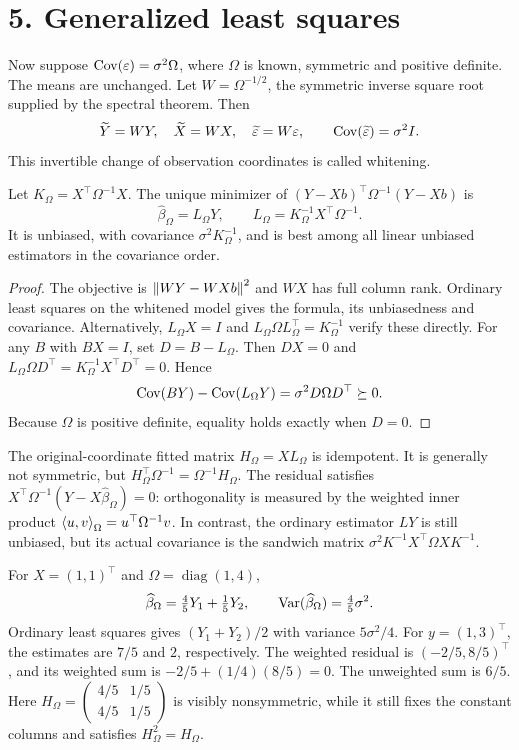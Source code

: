 \section*{5. Generalized least squares}
Now suppose $\operatorname{Cov}(\varepsilon)=\sigma^2\Omega$, where $\Omega$ is known,
symmetric and positive definite. The means are unchanged. Let
$W=\Omega^{-1/2}$, the symmetric inverse square root supplied by the
spectral theorem. Then
\[
\widetilde Y=WY,\quad\widetilde X=WX,\quad
\widetilde\varepsilon=W\varepsilon,
\qquad\operatorname{Cov}(\widetilde\varepsilon)=\sigma^2I.
\]
This invertible change of observation coordinates is called whitening.

\begin{theorem}\label{thm:11:gls}
Let $K_\Omega=X^\top\Omega^{-1}X$. The unique minimizer of
$(Y-Xb)^\top\Omega^{-1}(Y-Xb)$ is
\[
\widehat\beta_\Omega=L_\Omega Y,\qquad
L_\Omega=K_\Omega^{-1}X^\top\Omega^{-1}.
\]
It is unbiased, with covariance $\sigma^2K_\Omega^{-1}$, and is best
among all linear unbiased estimators in the covariance order.
\end{theorem}
\begin{proof}
The objective is $\left\lVert WY-WXb\right\rVert^2$ and $WX$ has full column rank.
Ordinary least squares on the whitened model gives the formula, its
unbiasedness and covariance. Alternatively, $L_\Omega X=I$ and
$L_\Omega\Omega L_\Omega^\top=K_\Omega^{-1}$ verify these directly.
For any $B$ with $BX=I$, set $D=B-L_\Omega$. Then $DX=0$ and
$L_\Omega\Omega D^\top=K_\Omega^{-1}X^\top D^\top=0$. Hence
\[
\operatorname{Cov}(BY)-\operatorname{Cov}(L_\Omega Y)=\sigma^2D\Omega D^\top\succeq0.
\]
Because $\Omega$ is positive definite, equality holds exactly when $D=0$.
\end{proof}

The original-coordinate fitted matrix
$H_\Omega=XL_\Omega$ is idempotent. It is generally not symmetric, but
$H_\Omega^\top\Omega^{-1}=\Omega^{-1}H_\Omega$.
The residual satisfies $X^\top\Omega^{-1}(Y-X\widehat\beta_\Omega)=0$:
orthogonality is measured by the weighted inner product
$\left\langle u,v\right\rangle_\Omega=u^\top\Omega^{-1}v$.
In contrast, the ordinary estimator $LY$ is still unbiased, but its
actual covariance is the sandwich matrix
$\sigma^2K^{-1}X^\top\Omega XK^{-1}$.

\begin{example}
For $X=(1,1)^\top$ and $\Omega=\operatorname{diag}(1,4)$,
\[
\widehat\beta_\Omega=\tfrac45Y_1+\tfrac15Y_2,\qquad
\operatorname{Var}(\widehat\beta_\Omega)=\tfrac45\sigma^2.
\]
Ordinary least squares gives $(Y_1+Y_2)/2$ with variance $5\sigma^2/4$.
For $y=(1,3)^\top$, the estimates are $7/5$ and $2$, respectively.
The weighted residual is $(-2/5,8/5)^\top$, and its weighted sum is
$-2/5+(1/4)(8/5)=0$. The unweighted sum is $6/5$.
Here $H_\Omega=\begin{pmatrix}4/5&1/5\\4/5&1/5\end{pmatrix}$ is visibly
nonsymmetric, while it still fixes the constant columns and satisfies
$H_\Omega^2=H_\Omega$.
\end{example}

